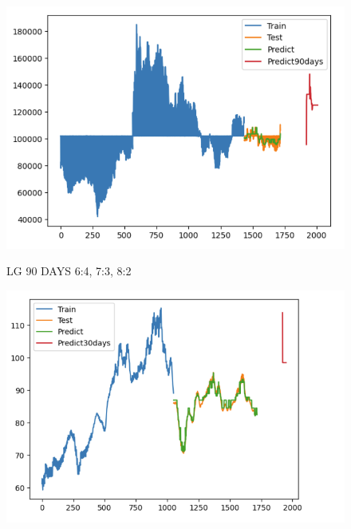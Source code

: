 \documentclass{article}
\begin{document}
\begin{multicols}{2}
\begin{figure}[H]
\begin{minipage}{0.15\textwidth}
    \label{fig:2}
    \end{minipage}%
    \begin{minipage}{0.15\textwidth}
    \centering
    \includegraphics[width=1\textwidth]{Image/Light GBM/LG_8_2_90.png}

    \label{fig:3}
    \end{minipage}
    \caption{LG 90 DAYS  6:4, 7:3, 8:2 }
\end{figure}

\begin{figure}[H]
    \centering
    \begin{minipage}{0.15\textwidth}
    \centering
    \includegraphics[width=1\textwidth]{Image/Light GBM/SN_6_4_30.png}
   

\end{minipage}
\end{figure}
\end{multicols}
\end{document}
